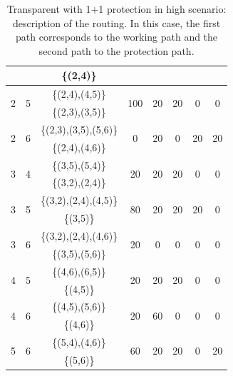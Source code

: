 \begin{table}[h!]
\begin{tabular}{|| c | c | c | c | c | c | c | c ||}
 & & \{(2,4)\} & & & & & \\ \hline
 \multirow{2}{*}{2} & \multirow{2}{*}{5} & \{(2,4),(4,5)\} & \multirow{2}{*}{100} & \multirow{2}{*}{20} & \multirow{2}{*}{20} & \multirow{2}{*}{0} & \multirow{2}{*}{0}\\
 & & \{(2,3),(3,5)\} & & & & & \\ \hline
 \multirow{2}{*}{2} & \multirow{2}{*}{6} & \{(2,3),(3,5),(5,6)\} & \multirow{2}{*}{0} & \multirow{2}{*}{20} & \multirow{2}{*}{0} & \multirow{2}{*}{20} & \multirow{2}{*}{20}\\
 & & \{(2,4),(4,6)\} & & & & & \\ \hline
 \multirow{2}{*}{3} & \multirow{2}{*}{4} & \{(3,5),(5,4)\} & \multirow{2}{*}{20} & \multirow{2}{*}{20} & \multirow{2}{*}{20} & \multirow{2}{*}{0} & \multirow{2}{*}{0}\\
 & & \{(3,2),(2,4)\} & & & & & \\ \hline
 \multirow{2}{*}{3} & \multirow{2}{*}{5} & \{(3,2),(2,4),(4,5)\} & \multirow{2}{*}{80} & \multirow{2}{*}{20} & \multirow{2}{*}{20} & \multirow{2}{*}{20} & \multirow{2}{*}{0}\\
 & & \{(3,5)\} & & & & & \\ \hline
 \multirow{2}{*}{3} & \multirow{2}{*}{6} & \{(3,2),(2,4),(4,6)\} & \multirow{2}{*}{20} & \multirow{2}{*}{0} & \multirow{2}{*}{0} & \multirow{2}{*}{0} & \multirow{2}{*}{0}\\
 & & \{(3,5),(5,6)\} & & & & & \\ \hline
 \multirow{2}{*}{4} & \multirow{2}{*}{5} & \{(4,6),(6,5)\} & \multirow{2}{*}{20} & \multirow{2}{*}{20} & \multirow{2}{*}{20} & \multirow{2}{*}{0} & \multirow{2}{*}{0}\\
 & & \{(4,5)\} & & & & & \\ \hline
 \multirow{2}{*}{4} & \multirow{2}{*}{6} & \{(4,5),(5,6)\} & \multirow{2}{*}{20} & \multirow{2}{*}{60} & \multirow{2}{*}{0} & \multirow{2}{*}{0} & \multirow{2}{*}{0}\\
 & & \{(4,6)\} & & & & & \\ \hline
 \multirow{2}{*}{5} & \multirow{2}{*}{6} & \{(5,4),(4,6)\} & \multirow{2}{*}{60} & \multirow{2}{*}{20} & \multirow{2}{*}{20} & \multirow{2}{*}{0} & \multirow{2}{*}{20}\\
 & & \{(5,6)\} & & & & & \\
 \hline
\end{tabular}
\caption{Transparent with 1+1 protection in high scenario: description of the routing. In this case, the first path corresponds to the working path and the second path to the protection path.}
\label{path_transp_protec_ref_high}
\end{table}

